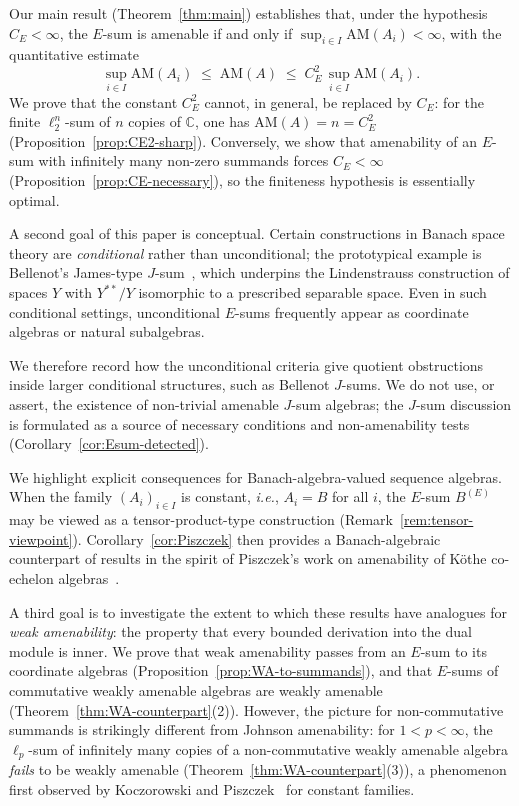 \documentclass[reqno]{amsart}
\theoremstyle{plain}
\theoremstyle{definition}
\theoremstyle{remark}
\newcommand{\AM}{\mathrm{AM}}
\renewcommand{\le}{\leqslant}
\begin{document}
Our main result (Theorem~\ref{thm:main}) establishes that, under the hypothesis $C_E < \infty$,
the $E$-sum is amenable if and only if $\sup_{i \in I} \AM(A_i) < \infty$,
with the quantitative estimate
\[
\sup_{i\in I}\AM(A_i) \;\le\; \AM(A) \;\le\; C_E^2\,\sup_{i\in I}\AM(A_i).
\]
We prove that the constant $C_E^2$ cannot, in general, be replaced by $C_E$:
for the finite $\ell_2^n$-sum of $n$ copies of $\mathbb{C}$, one has $\AM(A) = n = C_E^2$
(Proposition~\ref{prop:CE2-sharp}).
Conversely, we show that amenability of an $E$-sum with infinitely many non-zero summands
forces $C_E < \infty$ (Proposition~\ref{prop:CE-necessary}), so the finiteness hypothesis is
essentially optimal.

A second goal of this paper is conceptual.
Certain constructions in Banach space theory are \emph{conditional} rather than unconditional;
the prototypical example is Bellenot's James-type $J$-sum~\cite{Bellenot1982},
which underpins the Lindenstrauss construction of spaces $Y$ with $Y^{**}/Y$ isomorphic to a prescribed separable space. Even in such conditional settings, unconditional $E$-sums frequently appear as coordinate algebras or natural subalgebras.

We therefore record how the unconditional criteria give quotient obstructions inside larger
conditional structures, such as Bellenot $J$-sums.  We do not use, or assert, the existence
of non-trivial amenable $J$-sum algebras; the $J$-sum discussion is formulated as a source
of necessary conditions and non-amenability tests (Corollary~\ref{cor:Esum-detected}).

We highlight explicit consequences for Banach-algebra-valued sequence algebras.
When the family $(A_i)_{i \in I}$ is constant, \emph{i.e.}, $A_i = B$ for all $i$, the $E$-sum $B^{(E)}$ may be viewed as a tensor-product-type construction (Remark~\ref{rem:tensor-viewpoint}).
Corollary~\ref{cor:Piszczek} then provides a Banach-algebraic counterpart of results
in the spirit of Piszczek's work on amenability of K\"othe co-echelon algebras~\cite{Piszczek2019}.

A third goal is to investigate the extent to which these results have analogues for
\emph{weak amenability}: the property that every bounded derivation into the dual module is inner.
We prove that weak amenability passes from an $E$-sum to its coordinate algebras
(Proposition~\ref{prop:WA-to-summands}), and that $E$-sums of commutative weakly amenable
algebras are weakly amenable (Theorem~\ref{thm:WA-counterpart}(2)).
However, the picture for non-commutative summands is strikingly different from Johnson ame\-na\-bi\-li\-ty:
for $1 < p < \infty$, the $\ell_p$-sum of infinitely many copies of a non-commutative weakly amenable
algebra \emph{fails} to be weakly amenable (Theorem~\ref{thm:WA-counterpart}(3)),
a phenomenon first observed by Koczorowski and Piszczek~\cite{KoczorowskiPiszczek2024WeakAmenability}
for constant families.
\end{document}
